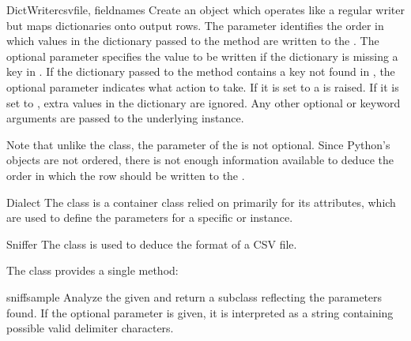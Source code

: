 \begin{classdesc}{DictWriter}{csvfile, fieldnames}
Create an object which operates like a regular writer but maps dictionaries
onto output rows.  The  parameter identifies the order in
which values in the dictionary passed to the  method are
written to the .  The optional  parameter
specifies the value to be written if the dictionary is missing a key in
.  If the dictionary passed to the 
method contains a key not found in , the optional
 parameter indicates what action to take.  If it is set
to  a  is raised.  If it is set to
, extra values in the dictionary are ignored.  Any other
optional or keyword arguments are passed to the underlying 
instance.

Note that unlike the  class, the 
parameter of the  is not optional.  Since Python's
 objects are not ordered, there is not enough information
available to deduce the order in which the row should be written to the
.

\end{classdesc}

\begin{classdesc*}{Dialect}{}
The  class is a container class relied on primarily for its
attributes, which are used to define the parameters for a specific
 or  instance.
\end{classdesc*}

\begin{classdesc}{Sniffer}{}
The  class is used to deduce the format of a CSV file.
\end{classdesc}

The  class provides a single method:

\begin{methoddesc}{sniff}{sample}
Analyze the given  and return a  subclass
reflecting the parameters found.  If the optional  parameter
is given, it is interpreted as a string containing possible valid delimiter
characters.
\end{methoddesc}

